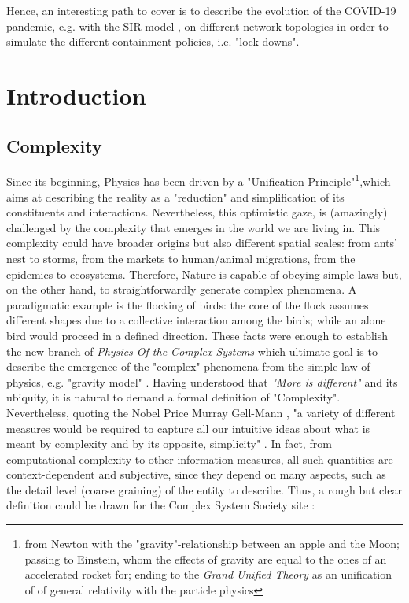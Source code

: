 \documentclass[a4paper,10pt,twoside]{book} %
\theoremstyle{definition}
\begin{document}
Hence, an interesting path to cover is to describe the evolution of the COVID-19 pandemic, e.g. with the SIR model \cite{pizzuti::2020_ItalyCOVIDnetwork}, on different network topologies in order to simulate the different containment policies, i.e. "lock-downs".

\mainmatter

\newcommand{\changefont}{%
    \fontsize{12}{12}
}
\pagestyle{fancy}
\fancyhf{}
\fancyhead[LE,RO]{\changefont \slshape \nouppercase{\rightmark}} %
\fancyhead[RE,LO]{\changefont \slshape \nouppercase{\leftmark}} %
\fancyfoot[C]{\thepage}

\chapter[Introduction]{Introduction}
%

\section{Complexity}
Since its beginning, Physics has been driven by a "Unification Principle"\footnote{from Newton with the "gravity"-relationship between an apple and the Moon; passing to Einstein, whom the effects of gravity are equal to the ones of an accelerated rocket for; ending to the \textit{Grand Unified Theory} as an unification of of general relativity with the particle physics},which aims at describing the reality as a "reduction" and simplification of its constituents and interactions. Nevertheless, this optimistic gaze, is (amazingly) challenged by the complexity that emerges in the world we are living in. This complexity could have broader origins but also different spatial scales: from ants' nest to storms, from the markets to human/animal migrations, from the epidemics to ecosystems. Therefore, Nature is capable of obeying simple laws but, on the other hand, to straightforwardly generate complex phenomena. A paradigmatic example is the flocking of birds: the core of the flock assumes different shapes due to a collective interaction among the birds; while an alone bird would proceed in a defined direction.
These facts were enough to establish the new branch of \textit{Physics Of the Complex Systems} which ultimate goal is to describe the emergence of the "complex" phenomena from the simple law of physics, e.g. "gravity model" \cite{GravityModelsandEmpiricalTrade}.
Having understood that \textit{"More is different"} \cite{Anderson:1972_MoreIsDifferent} and its ubiquity, it is natural to demand a formal definition of "Complexity". Nevertheless, quoting the Nobel Price Murray Gell-Mann \cite{Gell-Man:1987_S&C}, "a variety of different measures would be required to capture all our intuitive ideas about what is meant by complexity and by its opposite, simplicity" . In fact, from computational complexity to other information measures, all such quantities are context-dependent and subjective, since they depend on many aspects, such as the detail level (coarse graining) of the entity to describe. Thus, a rough but clear definition could be drawn for the Complex System Society site \cite{CSS:2021_compsystdef}:
\end{document}
